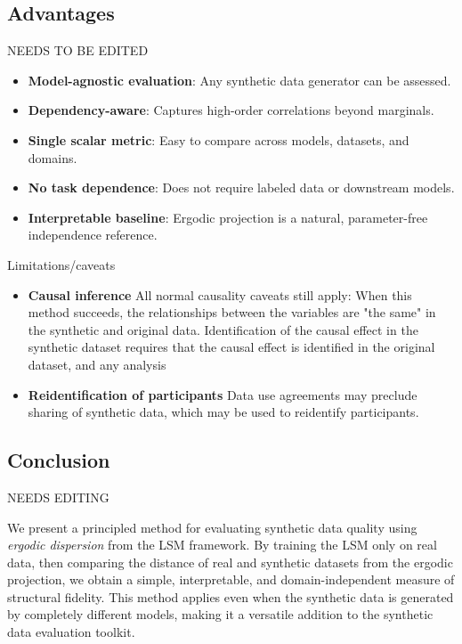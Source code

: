 \documentclass[10pt,journal]{IEEEtran}
\begin{document}
\subsection*{Advantages}
NEEDS TO BE EDITED
{\color{red}
\begin{itemize}
    \item \textbf{Model-agnostic evaluation}: Any synthetic data generator can be assessed.
    \item \textbf{Dependency-aware}: Captures high-order correlations beyond marginals.
    \item \textbf{Single scalar metric}: Easy to compare across models, datasets, and domains.
    \item \textbf{No task dependence}: Does not require labeled data or downstream models.
    \item \textbf{Interpretable baseline}: Ergodic projection is a natural, parameter-free independence reference.
\end{itemize}

Limitations/caveats
\begin{itemize}
    \item \textbf{Causal inference} All normal causality caveats still apply: When this method succeeds, the relationships between the variables are "the same" in the synthetic and original data. Identification of the causal effect in the synthetic dataset requires that the causal effect is identified in the original dataset, and any analysis 
    \item \textbf{Reidentification of participants} Data use agreements may preclude sharing of synthetic data, which may be used to reidentify participants. 
\end{itemize}
}

\subsection*{Conclusion}
NEEDS EDITING

{\color{red} We present a principled method for evaluating synthetic data quality using \emph{ergodic dispersion} from the LSM framework. By training the LSM only on real data, then comparing the distance of real and synthetic datasets from the ergodic projection, we obtain a simple, interpretable, and domain-independent measure of structural fidelity. This method applies even when the synthetic data is generated by completely different models, making it a versatile addition to the synthetic data evaluation toolkit.}




\end{document}
